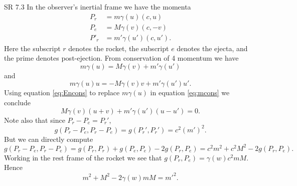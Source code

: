 \documentclass[minion]{homework}
\begin{document}
\begin{aproblems}
\hproblem SR 7.3
\subsol
In the observer's inertial frame we have the momenta
\begin{equation}
\begin{aligned}
P_r&=m\gamma(u)(c,u)\\
P_e&=M\gamma(v)(c,-v)\\
P'_r &= m'\gamma(u')(c,u').
\end{aligned}
\end{equation}
Here the subscript $r$ denotes the rocket, the subscript $e$ denotes
the ejecta, and the prime denotes post-ejection.  From
conservation of 4 momentum we have
\begin{equation}\label{eq:Encons}
m\gamma(u) = M\gamma(v) + m'\gamma(u')
\end{equation}
and
\begin{equation}\label{eq:mcons}
m\gamma(u)u = -M\gamma(v)v + m'\gamma(u')u'.
\end{equation}
Using equation \eqref{eq:Encons} to replace $m\gamma(u)$ in equation
\eqref{eq:mcons} we conclude
\begin{equation}\label{eq:a}
M\gamma(v)(u+v) + m'\gamma(u')(u-u') = 0.
\end{equation}
Note also that since $P_r-P_e=P_r'$,
\begin{equation}
g(P_r-P_e,P_r-P_e) = g(P_r',P_r') = c^2(m')^2.
\end{equation}
But we can directly compute
\[
g(P_r-P_e,P_r-P_e) = g(P_r,P_r) +g(P_e,P_e) - 2g(P_r,P_e) = c^2m^2 + c^2M^2 -2g(P_r,P_e).
\]
Working in the rest frame of the rocket we see that 
$g(P_r,P_e) = \gamma(w)c^2mM$. Hence
\begin{equation}\label{eq:c}
m^2+M^2-2\gamma(w)mM = m'^2.
\end{equation}


\end{aproblems}
\end{document}
